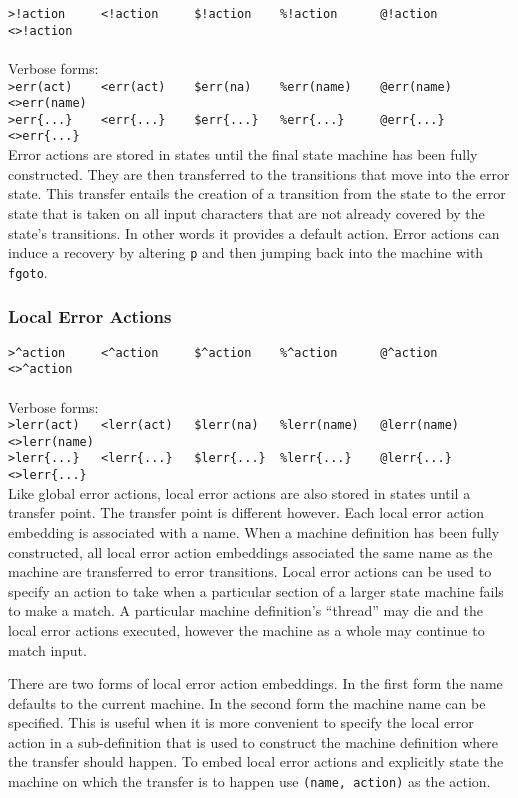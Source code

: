 \documentclass[letterpaper,11pt,oneside]{book}
\begin{document}
\noindent\verb|>!action     <!action     $!action    %!action      @!action      <>!action|\\
\\
\noindent Verbose forms:\\
\noindent\verb|>err(act)    <err(act)    $err(na)    %err(name)    @err(name)    <>err(name)|\\
\noindent\verb|>err{...}    <err{...}    $err{...}   %err{...}     @err{...}     <>err{...}|
\\

Error actions are stored in states until the final state machine has been fully
constructed. They are then transferred to the transitions that move into the
error state. This transfer entails the creation of a transition from the state
to the error state that is taken on all input characters that are not already
covered by the state's transitions. In other words it provides a default
action. Error actions can induce a recovery by altering \verb|p| and then jumping back
into the machine with \verb|fgoto|.

\subsubsection{Local Error Actions}

\noindent\verb|>^action     <^action     $^action    %^action      @^action      <>^action|\\
\\
\noindent Verbose forms:\\
\noindent\verb|>lerr(act)   <lerr(act)   $lerr(na)   %lerr(name)   @lerr(name)   <>lerr(name)|\\
\noindent\verb|>lerr{...}   <lerr{...}   $lerr{...}  %lerr{...}    @lerr{...}    <>lerr{...}|
\\

Like global error actions, local error actions are also stored in states until
a transfer point. The transfer point is different however. Each local error action
embedding is associated with a name. When a machine definition has been fully
constructed, all local error action embeddings associated the same name as the
machine are transferred to error transitions. Local error actions can be used
to specify an action to take when a particular section of a larger state
machine fails to make a match. A particular machine definition's ``thread'' may
die and the local error actions executed, however the machine as a whole may
continue to match input.

There are two forms of local error action embeddings. In the first form the name defaults
to the current machine. In the second form the machine name can be specified.  This
is useful when it is more convenient to specify the local error action in a
sub-definition that is used to construct the machine definition where the
transfer should happen. To embed local error actions and explicitly state the
machine on which the transfer is to happen use \verb|(name, action)| as the
action.
\end{document}
